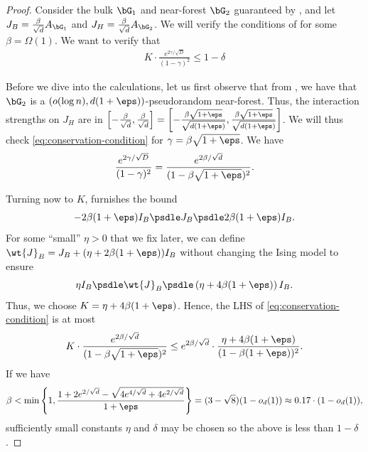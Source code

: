 \documentclass[11pt,letterpaper]{article}
\begin{document}
    \spinglassmixing*
    \begin{proof}
        Consider the bulk $\bG_1$ and near-forest $\bG_2$ guaranteed by , and let $J_B = \frac{\beta}{\sqrt{d}} A_{\bG_1}$ and $J_H = \frac{\beta}{\sqrt{d}} A_{\bG_2}$. 
        We will verify the conditions of  for some $\beta = \Omega(1)$. We want to verify that 
        \begin{align}
            K \cdot \frac{e^{2\gamma/\sqrt{D}}}{(1-\gamma)^2} \le 1-\delta 
            \label{eq:conservation-condition}
        \end{align}
        
        Before we dive into the calculations, let us first observe that from , we have that $\bG_2$ is a $(o(\log n),d(1+\eps))$-pseudorandom near-forest. 
        Thus, the interaction strengths on $J_H$ are in $\left[ -\frac{\beta}{\sqrt{d}} , \frac{\beta}{\sqrt{d}} \right] = \left[ - \frac{\beta\sqrt{1+\eps}}{\sqrt{d(1+\eps)}} , \frac{\beta\sqrt{1+\eps}}{\sqrt{d(1+\eps)}} \right]$.
        We will thus check \eqref{eq:conservation-condition} for $\gamma = \beta\sqrt{1+\eps}$. We have
        \[ \frac{e^{2\gamma/\sqrt{D}}}{(1-\gamma)^2} = \frac{e^{2\beta/\sqrt{d}}}{(1-\beta\sqrt{1+\eps})^2}. \]
    
        Turning now to $K$,  furnishes the bound
        \[
            -2\beta(1+\eps) I_B \psdle J_B \psdle 2\beta(1+\eps) I_B.
        \]
        For some ``small'' $\eta > 0$ that we fix later, we can define $\wt{J}_B = J_B + (\eta + 2\beta(1+\eps))I_B$ without changing the Ising model to ensure
        \[
            \eta I_B \psdle \wt{J}_B \psdle \left(\eta + 4\beta(1+\eps)\right) I_B.
        \] 
        Thus, we choose $K = \eta + 4\beta(1+\eps)$. Hence, the LHS of \eqref{eq:conservation-condition} is at most
        \begin{align*}
            K \cdot \frac{e^{2\beta/\sqrt{d}}}{(1-\beta\sqrt{1+\eps})^2} \le e^{2\beta/\sqrt{d}} \cdot \frac{\eta + 4\beta(1+\eps)}{(1-\beta(1+\eps))^2}.
        \end{align*}
        If we have
        \begin{align*}
            \beta < \min\left\{ 1 , \frac{1+2e^{2/\sqrt{d}} - \sqrt{4e^{4/\sqrt{d}} + 4e^{2/\sqrt{d}}}}{1+\eps} \right\} = (3-\sqrt{8})(1 - o_d(1)) \approx 0.17 \cdot (1-o_d(1)),
        \end{align*}
        sufficiently small constants $\eta$ and $\delta$ may be chosen so the above is less than $1-\delta$.
    

\end{proof}
\end{document}
